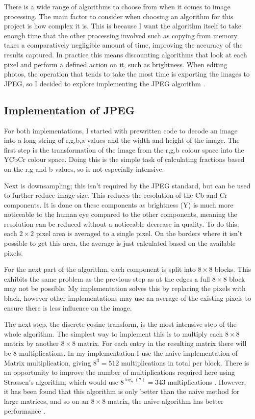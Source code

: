 \documentclass[12pt,a4paper]{article}
\begin{document}
There is a wide range of algorithms to choose from when it comes to image processing. The main factor to consider when choosing an algorithm for this project is how complex it is. This is because I want the algorithm itself to take enough time that the other processing involved such as copying from memory takes a comparatively negligible amount of time, improving the accuracy of the results captured. In practice this means discounting algorithms that look at each pixel and perform a defined action on it, such as brightness. When editing photos, the operation that tends to take the most time is exporting the images to JPEG, so I decided to explore implementing the JPEG algorithm \cite{jpeg}.

\subsection{Implementation of JPEG}

For both implementations, I started with prewritten code to decode an image into a long string of r,g,b,a values and the width and height of the image. The first step is the transformation of the image from the r,g,b colour space into the YCbCr colour space. Doing this is the simple task of calculating fractions based on the r,g and b values, so is not especially intensive.

Next is downsampling; this isn't required by the JPEG standard, but can be used to further reduce image size. This reduces the resolution of the Cb and Cr components. It is done on these components as brightness (Y) is much more noticeable to the human eye compared to the other components, meaning the resolution can be reduced without a noticeable decrease in quality. To do this, each $2\times 2$ pixel area is averaged to a single pixel. On the borders where it isn't possible to get this area, the average is just calculated based on the available pixels.

For the next part of the algorithm, each component is split into $8\times 8$ blocks. This exhibits the same problem as the previous step as at the edges a full $8\times 8$ block may not be possible. My implementation solves this by replacing the pixels with black, however other implementations may use an average of the existing pixels to ensure there is less influence on the image.

The next step, the discrete cosine transform, is the most intensive step of the whole algorithm. The simplest way to implement this is to multiply each $8\times 8$ matrix by another $8\times 8$ matrix. For each entry in the resulting matrix there will be $8$ multiplications. In my implementation I use the naive implementation of Matrix multiplication, giving $8^3 = 512$ multiplications in total per block. There is an opportunity to improve the number of multiplications required here using Strassen's algorithm, which would use $8^{\log_2(7)}=343$ multiplications \cite{strassen1969gaussian}. However, it has been found that this algorithm is only better than the naive method for large matrices, and so on an $8\times 8$ matrix, the naive algorithm has better performance \cite{huang2016strassen}.
\end{document}
